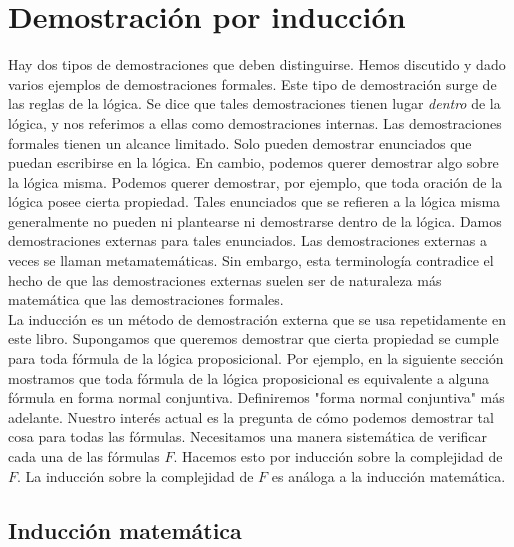 \documentclass[12pt,a4paper]{book}
\newcommand{\comillas}[1]{"#1"}
\begin{document}
    \section{Demostración por inducción}

    Hay dos tipos de demostraciones que deben distinguirse. Hemos discutido y dado varios ejemplos de demostraciones formales.
    Este tipo de demostración surge de las reglas de la lógica. Se dice que tales demostraciones tienen lugar \textit{dentro} de
    la lógica, y nos referimos a ellas como demostraciones internas. Las demostraciones formales tienen un alcance limitado.
    Solo pueden demostrar enunciados que puedan escribirse en la lógica. En cambio, podemos querer demostrar algo sobre la
    lógica misma. Podemos querer demostrar, por ejemplo, que toda oración de la lógica posee cierta propiedad. Tales
    enunciados que se refieren a la lógica misma generalmente no pueden ni plantearse ni demostrarse dentro de la lógica. Damos
    demostraciones externas para tales enunciados. Las demostraciones externas a veces se llaman metamatemáticas. Sin embargo,
    esta terminología contradice el hecho de que las demostraciones externas suelen ser de naturaleza más matemática que las
    demostraciones formales.\\
    La inducción es un método de demostración externa que se usa repetidamente en este libro. Supongamos que queremos demostrar
    que cierta propiedad se cumple para toda fórmula de la lógica proposicional. Por ejemplo, en la siguiente sección mostramos
    que toda fórmula de la lógica proposicional es equivalente a alguna fórmula en forma normal conjuntiva. Definiremos
    \comillas{forma normal conjuntiva} más adelante. Nuestro interés actual es la pregunta de cómo podemos demostrar tal cosa
    para todas las fórmulas. Necesitamos una manera sistemática de verificar cada una de las fórmulas $F$. Hacemos esto por
    inducción sobre la complejidad de $F$. La inducción sobre la complejidad de $F$ es análoga a la inducción matemática.

    \subsection{Inducción matemática}
\end{document}
